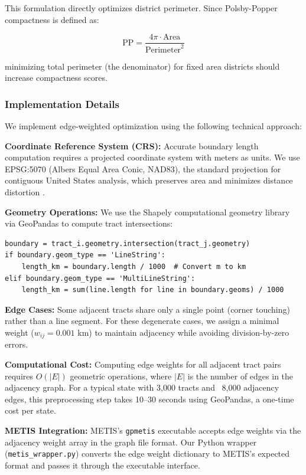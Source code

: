 This formulation directly optimizes district perimeter. Since Polsby-Popper compactness is defined as:

\[
\text{PP} = \frac{4\pi \cdot \text{Area}}{\text{Perimeter}^2}
\]

minimizing total perimeter (the denominator) for fixed area districts should increase compactness scores.

\subsubsection{Implementation Details}

We implement edge-weighted optimization using the following technical approach:

\textbf{Coordinate Reference System (CRS):} Accurate boundary length computation requires a projected coordinate system with meters as units. We use EPSG:5070 (Albers Equal Area Conic, NAD83), the standard projection for contiguous United States analysis, which preserves area and minimizes distance distortion \citep{snyder1987map}.

\textbf{Geometry Operations:} We use the Shapely computational geometry library \citep{shapely2023} via GeoPandas \citep{geopandas2020} to compute tract intersections:

\begin{verbatim}
boundary = tract_i.geometry.intersection(tract_j.geometry)
if boundary.geom_type == 'LineString':
    length_km = boundary.length / 1000  # Convert m to km
elif boundary.geom_type == 'MultiLineString':
    length_km = sum(line.length for line in boundary.geoms) / 1000
\end{verbatim}

\textbf{Edge Cases:} Some adjacent tracts share only a single point (corner touching) rather than a line segment. For these degenerate cases, we assign a minimal weight ($w_{ij} = 0.001$ km) to maintain adjacency while avoiding division-by-zero errors.

\textbf{Computational Cost:} Computing edge weights for all adjacent tract pairs requires $O(|E|)$ geometric operations, where $|E|$ is the number of edges in the adjacency graph. For a typical state with 3,000 tracts and ~8,000 adjacency edges, this preprocessing step takes 10--30 seconds using GeoPandas, a one-time cost per state.

\textbf{METIS Integration:} METIS's \texttt{gpmetis} executable accepts edge weights via the adjacency weight array in the graph file format. Our Python wrapper (\texttt{metis\_wrapper.py}) converts the edge weight dictionary to METIS's expected format and passes it through the executable interface.

